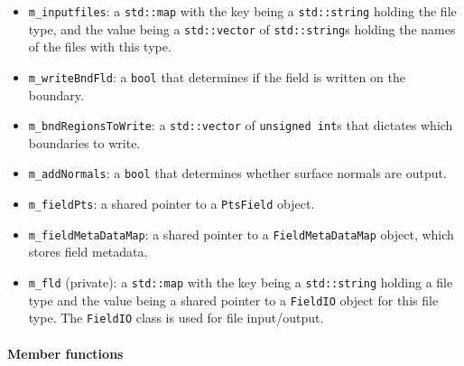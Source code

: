 \begin{itemize}
\item \verb+m_inputfiles+: a \verb+std::map+ with the key being a \verb+std::string+ holding the file type, and the value being a \verb+std::vector+ of \verb+std::string+s holding the names of the files with this type.

\item \verb+m_writeBndFld+: a \verb+bool+ that determines if the field is written on the boundary.

\item \verb+m_bndRegionsToWrite+: a \verb+std::vector+ of \verb+unsigned int+s that dictates which boundaries to write.  

\item \verb+m_addNormals+: a \verb+bool+ that determines whether surface normals are output.

\item \verb+m_fieldPts+: a shared pointer to a \verb+PtsField+ object.

\item \verb+m_fieldMetaDataMap+: a shared pointer to a \verb+FieldMetaDataMap+ object, which stores field metadata.

\item \verb+m_fld+ (private): a \verb+std::map+ with the key being a \verb+std::string+ holding a file type and the value being a shared pointer to a \verb+FieldIO+ object for this file type. The \verb+FieldIO+ class is used for file input/output.

\end{itemize}

\paragraph{Member functions}

